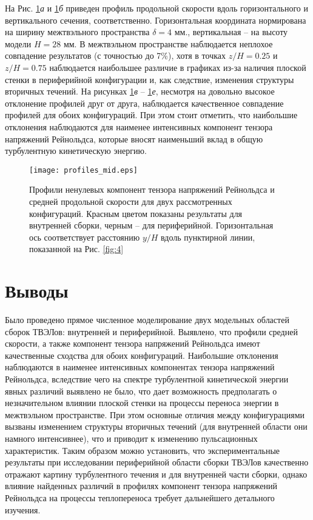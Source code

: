 %
%
%
На Рис. \ref{fig:5}\textit{а} и \ref{fig:5}\textit{б} приведен профиль продольной 
скорости вдоль горизонтального и вертикального сечения, соответственно.
%
Горизонтальная координата нормирована на ширину межтвэльного пространства 
$\delta = 4$ мм., вертикальная -- на высоту модели $H = 28$ мм.
%
В межтвэльном пространстве наблюдается неплохое совпадение результатов 
(с точностью до 7\%), хотя в точках $z/H = 0.25$ и $z/H = 0.75$ наблюдается наибольшее различие 
в графиках из-за наличия плоской стенки в периферийной конфигурации и, как следствие,
 изменения структуры вторичных течений.
%
На рисунках \ref{fig:5}\textit{в} -- \ref{fig:5}\textit{е}, 
несмотря на довольно высокое отклонение профилей друг от друга, 
наблюдается качественное совпадение профилей для обоих конфигураций.
%
При этом стоит отметить, что наибольшие отклонения наблюдаются для наименее интенсивных 
компонент тензора напряжений Рейнольдса, которые вносят наименьший вклад в общую турбулентную 
кинетическую энергию.

\begin{figure}[h!]
  \centering
  \texttt{[image: profiles\_mid.eps]}
  \caption{Профили ненулевых компонент тензора напряжений Рейнольдса и средней продольной скорости для двух рассмотренных конфигураций. Красным цветом показаны результаты для внутренней сборки, черным -- для периферийной. Горизонтальная ось соответствует расстоянию $y/H$ вдоль пунктирной линии, показанной на Рис. \ref{fig:4}}
  \label{fig:5}
\end{figure}





\section{Выводы}\label{ch4:conclusion}
%
Было проведено прямое численное моделирование двух модельных областей сборок ТВЭЛов: внутренней и периферийной. 
%
Выявлено, что профили средней скорости, а также компонент тензора напряжений 
Рейнольдса имеют качественные сходства для обоих конфигураций. 
%
Наибольшие отклонения наблюдаются в наименее интенсивных компонентах 
тензора напряжений Рейнольдса, вследствие чего на спектре турбулентной 
кинетической энергии явных различий выявлено не было,
 что дает возможность предполагать о незначительном влиянии плоской стенки на 
 процессы переноса энергии в межтвэльном пространстве. 
%
При этом основные отличия между конфигурациями вызваны изменением 
структуры вторичных течений (для внутренней области они намного интенсивнее), 
что и приводит к изменению пульсационных характеристик.
%
Таким образом можно установить, что экспериментальные результаты при 
исследовании периферийной области сборки ТВЭЛов качественно отражают картину 
турбулентного течения и для внутренней части сборки, однако влияние найденных различий
 в профилях компонент тензора напряжений Рейнольдса на процессы теплопереноса 
 требует дальнейшего детального изучения.

